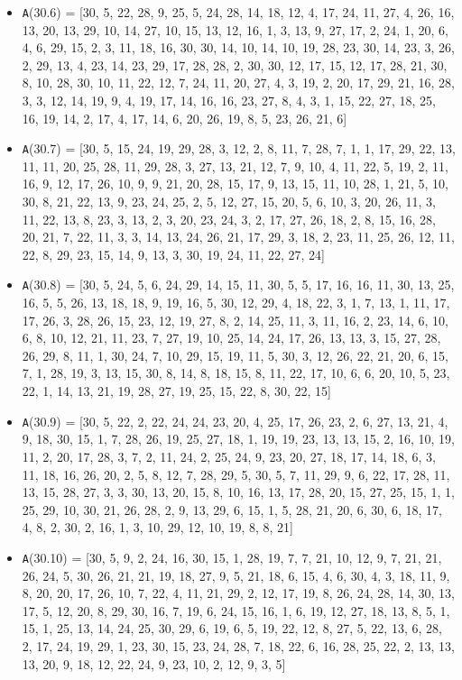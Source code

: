 \documentclass[runningheads, a4paper]{llncs}
\begin{document}
\begin{itemize}
	\item {\texttt A(30.6) = } [30, 5, 22, 28, 9, 25, 5, 24, 28, 14, 18, 12, 4, 17, 24, 11, 27, 4, 26, 16, 13, 20, 13, 29, 10, 14, 27, 10, 15, 13, 12, 16, 1, 3, 13, 9, 27, 17, 2, 24, 1, 20, 6, 4, 6, 29, 15, 2, 3, 11, 18, 16, 30, 30, 14, 10, 14, 10, 19, 28, 23, 30, 14, 23, 3, 26, 2, 29, 13, 4, 23, 14, 23, 29, 17, 28, 28, 2, 30, 30, 12, 17, 15, 12, 17, 28, 21, 30, 8, 10, 28, 30, 10, 11, 22, 12, 7, 24, 11, 20, 27, 4, 3, 19, 2, 20, 17, 29, 21, 16, 28, 3, 3, 12, 14, 19, 9, 4, 19, 17, 14, 16, 16, 23, 27, 8, 4, 3, 1, 15, 22, 27, 18, 25, 16, 19, 14, 2, 17, 4, 17, 14, 6, 20, 26, 19, 8, 5, 23, 26, 21, 6]
	\item {\texttt A(30.7) = } [30, 5, 15, 24, 19, 29, 28, 3, 12, 2, 8, 11, 7, 28, 7, 1, 1, 17, 29, 22, 13, 11, 11, 20, 25, 28, 11, 29, 28, 3, 27, 13, 21, 12, 7, 9, 10, 4, 11, 22, 5, 19, 2, 11, 16, 9, 12, 17, 26, 10, 9, 9, 21, 20, 28, 15, 17, 9, 13, 15, 11, 10, 28, 1, 21, 5, 10, 30, 8, 21, 22, 13, 9, 23, 24, 25, 2, 5, 12, 27, 15, 20, 5, 6, 10, 3, 20, 26, 11, 3, 11, 22, 13, 8, 23, 3, 13, 2, 3, 20, 23, 24, 3, 2, 17, 27, 26, 18, 2, 8, 15, 16, 28, 20, 21, 7, 22, 11, 3, 3, 14, 13, 24, 26, 21, 17, 29, 3, 18, 2, 23, 11, 25, 26, 12, 11, 22, 8, 29, 23, 15, 14, 9, 13, 3, 30, 19, 24, 11, 22, 27, 24]
	\item {\texttt A(30.8) = } [30, 5, 24, 5, 6, 24, 29, 14, 15, 11, 30, 5, 5, 17, 16, 16, 11, 30, 13, 25, 16, 5, 5, 26, 13, 18, 18, 9, 19, 16, 5, 30, 12, 29, 4, 18, 22, 3, 1, 7, 13, 1, 11, 17, 17, 26, 3, 28, 26, 15, 23, 12, 19, 27, 8, 2, 14, 25, 11, 3, 11, 16, 2, 23, 14, 6, 10, 6, 8, 10, 12, 21, 11, 23, 7, 27, 19, 10, 25, 14, 24, 17, 26, 13, 13, 3, 15, 27, 28, 26, 29, 8, 11, 1, 30, 24, 7, 10, 29, 15, 19, 11, 5, 30, 3, 12, 26, 22, 21, 20, 6, 15, 7, 1, 28, 19, 3, 13, 15, 30, 8, 14, 8, 18, 15, 8, 11, 22, 17, 10, 6, 6, 20, 10, 5, 23, 22, 1, 14, 13, 21, 19, 28, 27, 19, 25, 15, 22, 8, 30, 22, 15]
	
	\item {\texttt A(30.9) = } [30, 5, 22, 2, 22, 24, 24, 23, 20, 4, 25, 17, 26, 23, 2, 6, 27, 13, 21, 4, 9, 18, 30, 15, 1, 7, 28, 26, 19, 25, 27, 18, 1, 19, 19, 23, 13, 13, 15, 2, 16, 10, 19, 11, 2, 20, 17, 28, 3, 7, 2, 11, 24, 2, 25, 24, 9, 23, 20, 27, 18, 17, 14, 18, 6, 3, 11, 18, 16, 26, 20, 2, 5, 8, 12, 7, 28, 29, 5, 30, 5, 7, 11, 29, 9, 6, 22, 17, 28, 11, 13, 15, 28, 27, 3, 3, 30, 13, 20, 15, 8, 10, 16, 13, 17, 28, 20, 15, 27, 25, 15, 1, 1, 25, 29, 10, 30, 21, 26, 28, 2, 9, 13, 29, 6, 15, 1, 5, 28, 21, 20, 6, 30, 6, 18, 17, 4, 8, 2, 30, 2, 16, 1, 3, 10, 29, 12, 10, 19, 8, 8, 21]
	
	\item {\texttt A(30.10) = } [30, 5, 9, 2, 24, 16, 30, 15, 1, 28, 19, 7, 7, 21, 10, 12, 9, 7, 21, 21, 26, 24, 5, 30, 26, 21, 21, 19, 18, 27, 9, 5, 21, 18, 6, 15, 4, 6, 30, 4, 3, 18, 11, 9, 8, 20, 20, 17, 26, 10, 7, 22, 4, 11, 21, 29, 2, 12, 17, 19, 8, 26, 24, 28, 14, 30, 13, 17, 5, 12, 20, 8, 29, 30, 16, 7, 19, 6, 24, 15, 16, 1, 6, 19, 12, 27, 18, 13, 8, 5, 1, 15, 1, 25, 13, 14, 24, 25, 30, 29, 6, 19, 6, 5, 19, 22, 12, 8, 27, 5, 22, 13, 6, 28, 2, 17, 24, 19, 29, 1, 23, 30, 15, 23, 24, 28, 7, 18, 22, 6, 16, 28, 25, 22, 2, 13, 13, 13, 20, 9, 18, 12, 22, 24, 9, 23, 10, 2, 12, 9, 3, 5]
\end{itemize}
\end{document}

